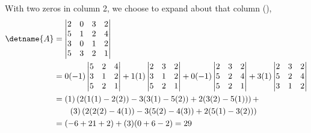 With two zeros in column 2, we choose to expand about that column (),
\begin{align*}
\detname{A}
&=
\begin{vmatrix}
 2 & 0 & 3 & 2 \\
 5 & 1 & 2 & 4 \\
 3 & 0 & 1 & 2 \\
 5 & 3 & 2 & 1
\end{vmatrix}\\
%
&=
0(-1)
\begin{vmatrix}
 5 &  2 & 4 \\
 3 &  1 & 2 \\
 5 &  2 & 1
\end{vmatrix}
+
1(1)
\begin{vmatrix}
 2 &  3 & 2 \\
 3 &  1 & 2 \\
 5 &  2 & 1
\end{vmatrix}
+
0(-1)
\begin{vmatrix}
 2 & 3 & 2 \\
 5 &  2 & 4 \\
 5 &  2 & 1
\end{vmatrix}
+
3(1)
\begin{vmatrix}
 2 &  3 & 2 \\
 5 &  2 & 4 \\
 3 &  1 & 2 
\end{vmatrix}\\
%
&=
(1)\left(2(1(1)-2(2)) - 3(3(1)-5(2)) + 2(3(2)-5(1))\right) +\\
&\quad\quad(3)\left(2(2(2)-4(1)) - 3(5(2)-4(3)) + 2(5(1)-3(2))\right)\\
%
&=
(-6+21+2) + (3)(0+6-2) = 29
\end{align*}
